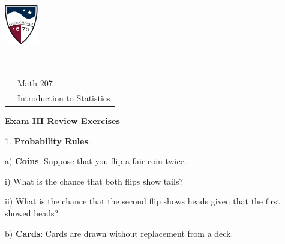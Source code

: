\documentclass[10pt]{article}
\begin{document}
\pagestyle{empty}
\lstset{language=R, showspaces=false, showstringspaces=false}

\href{http://www.su.edu}{\includegraphics[height=1.75cm]{sulogo.eps}}
\vspace{-1.79cm}

{{\ }\hfill\small
\begin{tabular}{cl}
& Math 207\\
& Introduction to Statistics\\
\end{tabular}
}
\setlength{\baselineskip}{1.05\baselineskip}

\medskip

\begin{center}
\textbf{\large  Exam III Review Exercises}
\end{center}\vspace{-15pt}

\newcommand{\HH}{\hspace{20pt}\hphantom{a) } }
%
\newcommand{\twobox}[2]{\begin{pspicture}(-0.3,0.2)(2,1.3)
\psframe(0,0)(0.7,0.7)\rput(0.35,0.35){#1}
\psframe(1,0)(1.7,0.7)\rput(1.35,0.35){#2}
\psline(-0.3,0.9)(-0.3,-0.2)(2,-0.2)(2,0.9)(-0.3,0.9)
\end{pspicture}}
%
\newcommand{\threebox}[3]{\begin{pspicture}(0.2,0.2)(2.5,1.3)
\psframe(0,0)(0.7,0.7)\rput(0.35,0.35){#1}
\psframe(1,0)(1.7,0.7)\rput(1.35,0.35){#2}
\psframe(2,0)(2.7,0.7)\rput(2.35,0.35){#3}
\psline(-0.3,0.9)(-0.3,-0.2)(3,-0.2)(3,0.9)(-0.3,0.9)
\end{pspicture}}

1. \textbf{Probability Rules}:

\hspace{10pt} a) \textbf{Coins}: Suppose that you flip a fair coin twice.

\hspace{20pt} i) What is the chance that both flips show tails?
\vspace{.5in}

\hspace{20pt} ii) What is the chance that the second flip shows heads given that the first showed heads?
\vspace{.5in}

\hspace{10pt} b) \textbf{Cards}:  Cards are drawn without replacement from a deck.
\end{document}
